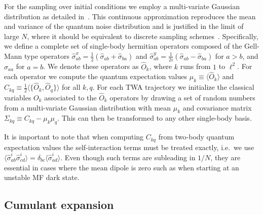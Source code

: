 \documentclass[aps,prx,superscriptaddress,twocolumn,notitlepage,nofootinbib,longbibliography]{revtex4-2}
\begin{document}
For the sampling over initial conditions we employ a multi-variate Gaussian distribution as detailed in~\cite{WurtzPolkovnikov_AP2018}. This continuous approximation reproduces the mean and variance of the quantum noise distribution and is justified in the limit of large $N$, where it should be equivalent to discrete sampling schemes~\cite{ZhuRey_NJP2019}. Specifically, we define a complete set of single-body hermitian operators composed of the Gell-Mann type operators $\hat{\sigma}^x_{ab} = \frac{1}{2} (\hat{\sigma}_{ab} + \hat{\sigma}_{ba})$ and $\hat{\sigma}^y_{ab} = \frac{1}{2i} (\hat{\sigma}_{ab} - \hat{\sigma}_{ba})$ for $a>b$, and $\hat{\sigma}_{aa}$ for $a=b$.
We denote these operators as $\hat{O}_k$, where $k$ runs from $1$ to $\ell^2$.
For each operator we compute the quantum expectation values $\mu_k\equiv\langle \hat{O}_k \rangle$ and $C_{kq}\equiv \frac{1}{2}\langle \{ \hat{O}_k, \hat{O}_q \} \rangle$ for all $k,q$. For each TWA trajectory we initialize the classical variables $O_k$ associated to the $\hat{O}_k$ operators by drawing a set of random numbers from a multi-variate Gaussian distribution with mean $\mu_k$ and covariance matrix $\Sigma_{kq}\equiv C_{kq}-\mu_k\mu_q$. This can then be transformed to any other single-body basis.

It is important to note that when computing $C_{kq}$ from two-body quantum expectation values the self-interaction terms must be treated exactly, i.e.~we use $\langle \hat{\sigma}^i_{ab} \hat{\sigma}^i_{cd} \rangle = \delta_{bc} \langle \hat{\sigma}^i_{ad} \rangle$.
Even though such terms are subleading in $1/N$, they are essential in cases where the mean dipole is zero such as when starting at an unstable MF dark state.







\subsection{Cumulant expansion}
\end{document}
